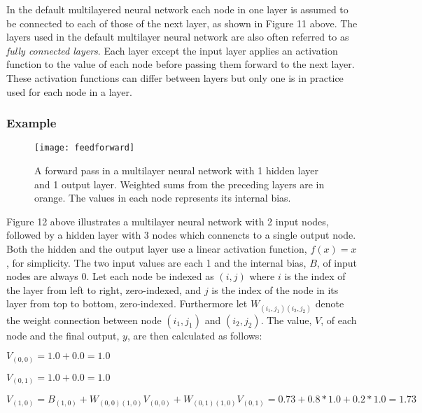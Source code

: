 \documentclass[titlepage]{article}
\begin{document}
\vskip 0.3cm

\noindent
In the default multilayered neural network \cite{charu} each node in one layer is assumed to be connected to each of those of the next layer, as shown in Figure 11 above. The layers used in the default multilayer neural network are also often referred to as \emph{fully connected layers}. Each layer except the input layer applies an activation function to the value of each node before passing them forward to the next layer. These activation functions can differ between layers but only one is in practice used for each node in a layer.

\vskip 0.2cm

\subsubsection{Example}

\begin{figure}[h]
    \centering
    \texttt{[image: feedforward]}
    \caption{A forward pass in a multilayer neural network with 1 hidden layer and 1 output layer. Weighted sums from the preceding layers are in orange. The values in each node represents its internal bias.}
\end{figure}

\noindent
Figure 12 above illustrates a multilayer neural network with 2 input nodes, followed by a hidden layer with 3 nodes which connencts to a single output node. Both the hidden and the output layer use a linear activation function, $f(x) = x$, for simplicity. The two input values are each 1 and the internal bias, $B$, of input nodes are always 0. Let each node be indexed as $(i, j)$ where $i$ is the index of the layer from left to right, zero-indexed, and $j$ is the index of the node in its layer from top to bottom, zero-indexed. Furthermore let $W_{(i_{1}, j_{1}) (i_{2}, j_{2})}$ denote the weight connection between node $(i_{1}, j_{1})$ and $(i_{2}, j_{2})$. The value, $V$, of each node and the final output, $y$, are then calculated as follows: 

\vskip 0.8cm

\centerline{$V_{(0, 0)} = 1.0 + 0.0 = 1.0$}

\vskip 0.2cm

\centerline{$V_{(0, 1)} = 1.0 + 0.0 = 1.0$}

\vskip 0.5cm

\centerline{$V_{(1, 0)} = B_{(1, 0)} + W_{(0, 0) (1, 0)} V_{(0, 0)} + W_{(0, 1) (1, 0)} V_{(0, 1)} = 0.73 + 0.8 * 1.0 + 0.2 * 1.0 = 1.73$}
\end{document}
